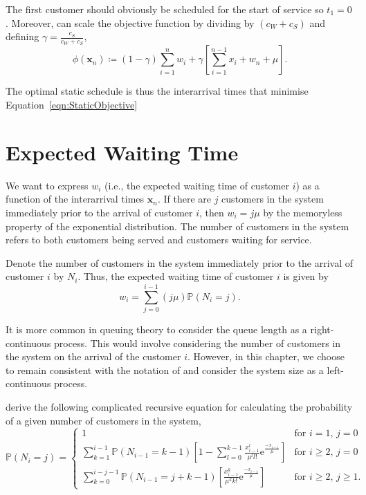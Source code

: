 The first customer should obviously be scheduled for the start of service so $t_{1} = 0$. Moreover, can scale the objective function by dividing by $(c_{W} + c_{S})$ and defining $\gamma = \frac{c_{S}}{c_{W} + c_{S}}$,
\begin{equation}
	\phi (\mathbf{x}_{n}) \coloneqq (1 - \gamma) \sum_{i = 1}^{n} w_{i} + \gamma \left[ \sum_{i = 1}^{n - 1} x_{i} + w_{n} + \mu \right].
	\label{eqn:StaticObjective}
\end{equation}

The optimal static schedule is thus the interarrival times that minimise Equation~\ref{eqn:StaticObjective}

\section{Expected Waiting Time}
We want to express $w_{i}$ (i.e., the expected waiting time of customer $i$) as a function of the interarrival times $\mathbf{x}_{n}$. If there are $j$ customers in the system immediately prior to the arrival of customer $i$, then $w_{i} = j \mu$ by the memoryless property of the exponential distribution. The number of customers in the system refers to both customers being served and customers waiting for service.

Denote the number of customers in the system immediately prior to the arrival of customer $i$ by $N_{i}$. Thus, the expected waiting time of customer $i$ is given by
\begin{equation}
	w_{i} = \sum_{j = 0}^{i - 1} (j \mu) \mathbb{P} (N_{i} = j).
\end{equation}

It is more common in queuing theory to consider the queue length as a right-continuous process. This would involve considering the number of customers in the system on the arrival of the customer $i$. However, in this chapter, we choose to remain consistent with the notation of \citet{Pegden} and consider the system size as a left-continuous process.

\citet{Pegden} derive the following complicated recursive equation for calculating the probability of a given number of customers in the system,
\begin{equation}
	\mathbb{P} (N_{i} = j) = \begin{cases} 1 & \text{for $i = 1$, $j = 0$} \\
	\sum_{k = 1}^{i - 1} \mathbb{P} (N_{i - 1} = k - 1) \left[ 1 - \sum_{l = 0}^{k - 1} \frac{x_{i - 1}^{l}}{\mu^{l} l!} \mathrm{e}^{\frac{- x_{i - 1}}{\mu}}\right] & \text{for $i \geq 2$, $j = 0$} \\
	\sum_{k = 0}^{i - j - 1} \mathbb{P} (N_{i - 1} = j + k - 1) \left[ \frac{x_{i - 1}^{k}}{\mu^{k} k!} \mathrm{e}^{\frac{- x_{i - 1}}{\mu}} \right] & \text{for $i \geq 2$, $j \geq 1$}. \end{cases}
	\label{eqn:StaticProbSystem}
\end{equation}

